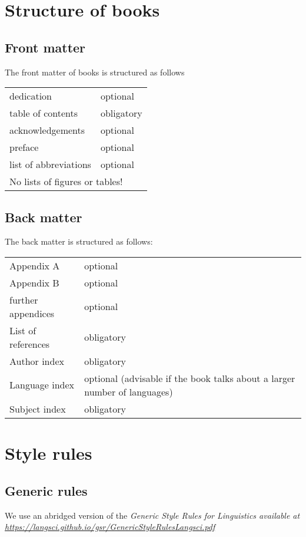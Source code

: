 \chapter{Structure of books}

\section{Front matter}

The front matter of \lsp books is structured as follows
\begin{table}[h]
\begin{tabular}{p{4cm}p{6cm}}
 dedication & optional\\
table of contents & obligatory\\ 
acknowledgements & optional\\
preface & optional\\
list of abbreviations & optional\\
\multicolumn{2}{l}{No lists of figures or tables!}\\
\end{tabular}
\end{table}
\section{Back matter}
The back matter is structured as follows:
\begin{table}[h]
\begin{tabular}{p{4cm}p{6cm}}
 Appendix A & optional \\
 Appendix B & optional \\
 further appendices & optional \\
 List of references & obligatory \\
 Author index & obligatory \\
 Language index  & optional (advisable if the book talks about a larger number of languages)\\
 Subject index & obligatory \\
\end{tabular}
 \end{table}


\chapter{Style rules}
\section{Generic rules}
We use an abridged version of the \em Generic Style Rules for Linguistics \em available at \url{https://langsci.github.io/gsr/GenericStyleRulesLangsci.pdf}


